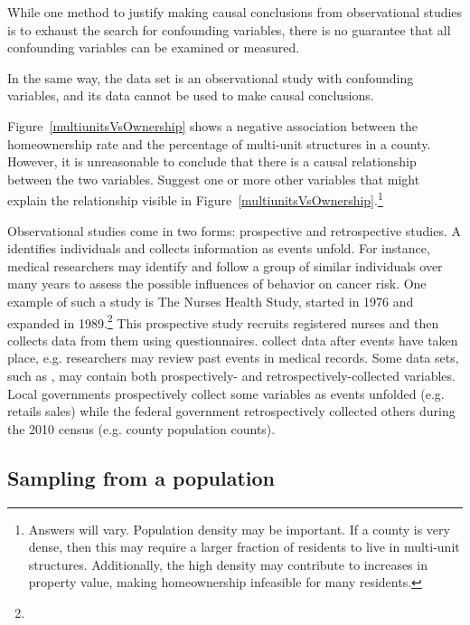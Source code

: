 While one method to justify making causal conclusions from observational studies is to exhaust the search for confounding variables, there is no guarantee that all confounding variables can be examined or measured.

In the same way, the  data set is an observational study with confounding variables, and its data cannot be used to make causal conclusions.

\begin{exercise}
Figure~\ref{multiunitsVsOwnership} shows a negative association between the homeownership rate and the percentage of multi-unit structures in a county. However, it is unreasonable to conclude that there is a causal relationship between the two variables. Suggest one or more other variables that might explain the relationship visible in Figure~\ref{multiunitsVsOwnership}.\footnote{Answers will vary. Population density may be important. If a county is very dense, then this may require a larger fraction of residents to live in multi-unit structures. Additionally, the high density may contribute to increases in property value, making homeownership infeasible for many residents.}
\end{exercise}

Observational studies come in two forms: prospective and retrospective studies. A  identifies individuals and collects information as events unfold. For instance, medical researchers may identify and follow a group of similar individuals over many years to assess the possible influences of behavior on cancer risk. One example of such a study is The Nurses Health Study, started in 1976 and expanded in 1989.\footnote{} This prospective study recruits registered nurses and then collects data from them using questionnaires.  collect data after events have taken place, e.g. researchers may review past events in medical records. Some data sets, such as , may contain both prospectively- and retrospectively-collected variables. Local governments prospectively collect some variables as events unfolded (e.g. retails sales) while the federal government retrospectively collected others during the 2010 census (e.g. county population counts).


\subsection{Sampling from a population}

